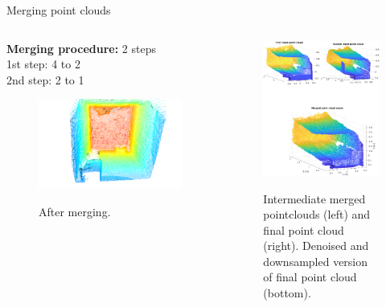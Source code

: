 \documentclass{beamer}
\begin{document}
\begin{frame}{Merging point clouds}

\begin{columns}
	\begin{column}{0.5\textwidth}
\textbf{Merging procedure:} 2 steps\\

1st  step: 4 to 2\\
2nd step: 2 to 1\\

\begin{figure}
	\includegraphics[width=0.8\linewidth]{Figures/depth02.png}
	\label{depth02}
	\caption{ After merging.}
\end{figure}

	\end{column}
	\begin{column}{0.6\textwidth}  %
		\begin{center}
			\begin{figure}
				\includegraphics[width=0.8\linewidth]{Figures/merge_h.eps}
				\label{merge}
				\caption{ Intermediate merged pointclouds (left) and final point cloud (right). Denoised and downsampled version of final point cloud (bottom).}
			\end{figure}


\end{center}
\end{column}
\end{columns}
\end{frame}
\end{document}
